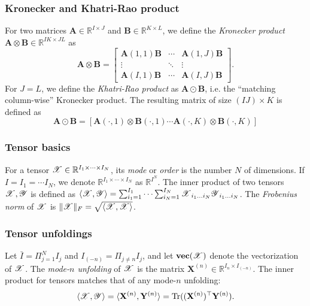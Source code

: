 \subsubsection{Kronecker and Khatri-Rao product}
For two matrices $\mathbf{A} \in \mathbb{R}^{I \times J}$ and $\mathbf{B} \in \mathbb{R}^{K \times L}$,
we define the \textit{Kronecker product}
$\mathbf{A} \otimes \mathbf{B} \in \mathbb{R}^{IK \times JL}$ as
\begin{equation}\label{kronecker}
\mathbf{A} \otimes \mathbf{B} = \left[
\begin{array}{ccc}
\mathbf{A}(1,1)\mathbf{B}  & \cdots & \mathbf{A}(1,J)\mathbf{B} \\
\vdots & \ddots & \vdots \\
\mathbf{A}(I,1)\mathbf{B} & \cdots &   \mathbf{A}(I,J)\mathbf{B}
\end{array}
\right].
\end{equation}
For $J = L$, we define the \textit{Khatri-Rao product} as $\mathbf{A} \odot \mathbf{B}$, i.e. the ``matching column-wise'' Kronecker product.
The resulting matrix of size $(IJ) \times K$ is defined as
\[\mathbf{A} \odot \mathbf{B} = [\mathbf{A}(\cdot,1) \otimes \mathbf{B}(\cdot,1) \cdots \mathbf{A}(\cdot,K) \otimes \mathbf{B}(\cdot,K) ] \]



\subsubsection{Tensor basics}
For a tensor $\T{X} \in \mathbb{R}^{I_1 \times \cdots \times I_N}$,
its \textit{mode} or \textit{order} is the number $N$ of dimensions.
If $I = I_1 = \cdots I_N$, we denote $\mathbb{R}^{I_1 \times \cdots \times I_N}$ as $\mathbb{R}^{I^N}$.
The inner product of two tensors $\T{X}, \T{Y}$ is defined as
$\langle\T{X}, \T{Y}\rangle = \sum_{i_1=1}^{I_1}\cdots \sum_{i_N=1}^{I_N}\T{X}_{i_1\dots i_N}\T{Y}_{i_1\dots i_N}$.
The \textit{Frobenius norm} of $\T{X}$ is
$\|\T{X}\|_F = \sqrt{\langle\T{X},\T{X}\rangle}$.

\subsubsection{Tensor unfoldings}
Let $\bar{I} = \Pi_{j = 1}^N I_j $ and $I_{(-n)} = \Pi_{j \neq n} I_j $,
and let $\vc(\T{X})$ denote the vectorization of $\T{X}$.
The \textit{mode-$n$ unfolding} of $\T{X}$ is the matrix
$\mathbf{X}^{(n)} \in \mathbb{R}^{I_n \times I_{(-n)}}$.
The inner product for tensors matches that of any mode-$n$ unfolding:
\begin{equation}
\label{eq:F_norm_equivalent}
\langle \T{X}, \T{Y}\rangle = \langle \mathbf{X}^{(n)}, \mathbf{Y}^{(n)}\rangle = \rm{Tr}((\mathbf{X}^{(n)})^\top \mathbf{Y}^{(n)}).
\end{equation}


